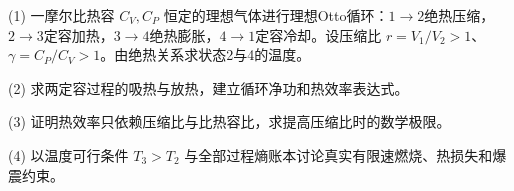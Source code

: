 (1) 一摩尔比热容 \(C_V,C_P\) 恒定的理想气体进行理想Otto循环：\(1\to 2\)绝热压缩，\(2\to 3\)定容加热，\(3\to 4\)绝热膨胀，\(4\to 1\)定容冷却。设压缩比 \(r=V_1/V_2>1\)、\(\gamma=C_P/C_V>1\)。由绝热关系求状态2与4的温度。

(2) 求两定容过程的吸热与放热，建立循环净功和热效率表达式。

(3) 证明热效率只依赖压缩比与比热容比，求提高压缩比时的数学极限。

(4) 以温度可行条件 \(T_3>T_2\) 与全部过程熵账本讨论真实有限速燃烧、热损失和爆震约束。
